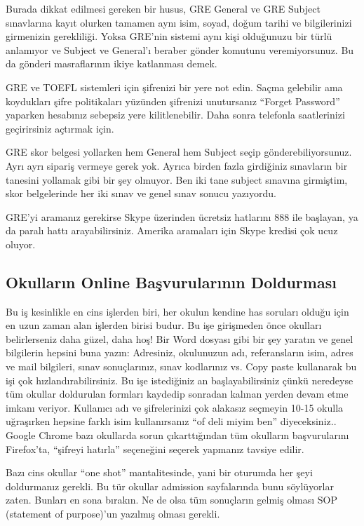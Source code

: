 \documentclass[12pt]{article}
\begin{document}
Burada dikkat edilmesi gereken bir husus, GRE General ve GRE Subject sınavlarına kayıt olurken tamamen aynı isim, soyad, doğum tarihi ve bilgilerinizi girmenizin gerekliliği. Yoksa GRE'nin sistemi aynı kişi olduğunuzu bir türlü anlamıyor ve Subject ve General'ı beraber gönder komutunu veremiyorsunuz. Bu da gönderi masraflarının ikiye katlanması demek. 

GRE ve TOEFL sistemleri için şifrenizi bir yere not edin. Saçma gelebilir ama koydukları şifre politikaları yüzünden şifrenizi unutursanız ``Forget Password'' yaparken hesabınız sebepsiz yere kilitlenebilir. Daha sonra telefonla saatlerinizi geçirirsiniz açtırmak için. 

GRE skor belgesi yollarken hem General hem Subject seçip gönderebiliyorsunuz. Ayrı ayrı sipariş vermeye gerek yok. Ayrıca birden fazla girdiğiniz sınavların bir tanesini yollamak gibi bir şey olmuyor. Ben iki tane subject sınavına girmiştim, skor belgelerinde her iki sınav ve genel sınav sonucu yazıyordu. 

GRE'yi aramanız gerekirse Skype üzerinden ücretsiz hatlarını 888 ile başlayan, ya da paralı hattı arayabilirsiniz. Amerika aramaları için Skype kredisi çok ucuz oluyor.  

\subsection{Okulların Online Başvurularının Doldurması}
Bu iş kesinlikle en cins işlerden biri, her okulun kendine has soruları olduğu için en uzun zaman alan işlerden birisi budur. Bu işe girişmeden önce okulları belirlerseniz daha güzel, daha hoş! Bir Word dosyası gibi bir şey yaratın ve genel bilgilerin hepsini buna yazın: Adresiniz, okulunuzun adı, referansların isim, adres ve mail bilgileri, sınav sonuçlarınız, sınav kodlarınız vs. Copy paste kullanarak bu işi çok hızlandırabilirsiniz. Bu işe istediğiniz an başlayabilirsiniz çünkü neredeyse tüm okullar doldurulan formları kaydedip sonradan kalınan yerden devam etme imkanı veriyor. Kullanıcı adı ve şifrelerinizi çok alakasız seçmeyin 10-15 okulla uğraşırken hepsine farklı isim kullanırsanız ``of deli miyim ben'' diyeceksiniz.. Google Chrome bazı okullarda sorun çıkarttığından tüm okulların başvurularını Firefox'ta, ``şifreyi hatırla'' seçeneğini seçerek yapmanız tavsiye edilir.  

Bazı cins okullar ``one shot'' mantalitesinde, yani bir oturumda her şeyi doldurmanız gerekli. Bu tür okullar admission sayfalarında bunu söylüyorlar zaten. Bunları en sona bırakın. Ne de olsa tüm sonuçların gelmiş olması SOP (statement of purpose)'un yazılmış olması gerekli. 
\end{document}

